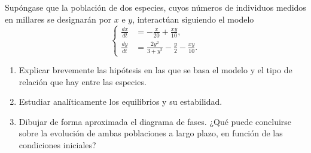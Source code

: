 \documentclass[11pt]{report}
\begin{document}
\begin{exercise}[Junio de 2022]
    Supóngase que la población de dos especies, cuyos números de individuos medidos en millares se designarán por $x$ e $y$, interactúan siguiendo el modelo
    \[\left\{\begin{alignedat}{1}
        \frac{dx}{dt} &= -\frac{x}{20}+\frac{xy}{10}, \\[10pt]
        \frac{dy}{dt} &= \frac{2y^2}{3+y^2}-\frac{y}{2}-\frac{xy}{10}.
    \end{alignedat}\right.\]
    \begin{enumerate}
        \item Explicar brevemente las hipótesis en las que se basa el modelo y el tipo de relación que hay entre las especies.
        \item Estudiar analíticamente los equilibrios y su estabilidad.
        \item Dibujar de forma aproximada el diagrama de fases. ¿Qué puede concluirse sobre la evolución de ambas poblaciones a largo plazo, en función de las condiciones iniciales?
    \end{enumerate}
\end{exercise}
\end{document}
